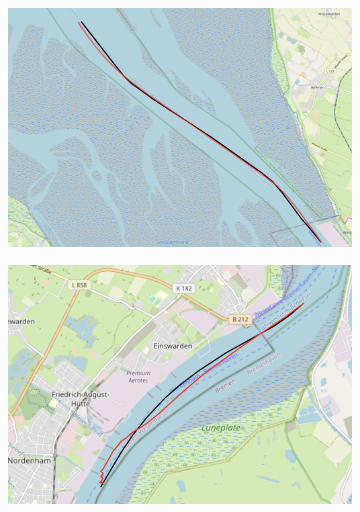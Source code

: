 \begin{figure}[H]\ContinuedFloat
     \begin{subfigure}[b]{0.48\textwidth}
         \centering
       \includegraphics[width=\textwidth]{images/ais/tracks/pred3.png}
        \caption{}
         \label{fig:double1}
     \end{subfigure}
     \hfill
     \begin{subfigure}[b]{0.48\textwidth}
         \centering
             \includegraphics[width=\textwidth]{images/ais/tracks/pred2.png}
              \caption{}
         \label{fig:double2}
     \end{subfigure}
\end{figure}
